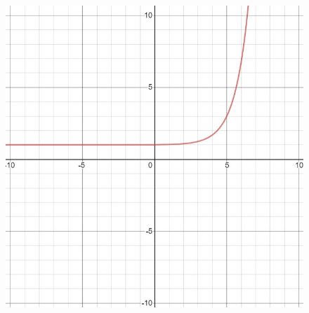 \documentclass{article}
\begin{document}
    \begin{figure}[hbt!]
        \centering
        \includegraphics{logistic_model}
    \end{figure}
\end{document}
